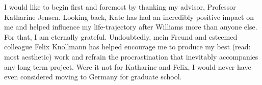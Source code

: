 %
%
%
%

\noindent I would like to begin first and foremost by thanking my advisor, Professor Katharine Jensen. Looking back, Kate has had an incredibly positive impact on me and helped influence my  life-trajectory after Williams more than anyone else. For that, I am eternally grateful. Undoubtedly, mein Freund and esteemed colleague Felix Knollmann has helped encourage me to produce my best (read: most aesthetic) work and refrain the procrastination that inevitably accompanies any long term project. Were it not for Katharine and Felix, I would never have even considered moving to Germany for graduate school.


